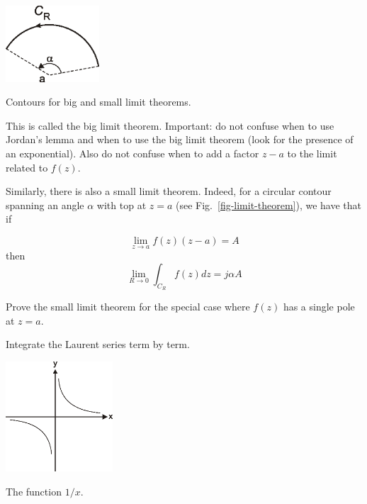 \begin{marginfigure}
\centering
\includegraphics[width=3.5cm]{complex/figures/limit_theorem}
\caption{Contours for big and small limit theorems.}
\label{fig-limit-theorem}
\end{marginfigure}

This is called the big limit theorem. Important: do not confuse when to use Jordan's lemma and when to use the big limit theorem (look for the presence of an exponential). Also do not confuse when to add a factor $z-a$ to the limit related to $f(z)$.

Similarly, there is also a small limit theorem. Indeed, for a circular contour spanning an angle $\alpha$ with top at $z=a$ (see Fig.~\ref{fig-limit-theorem}), we have that if

\begin{equation}
\lim_{z \to a}  f(z) (z-a) = A
\end{equation}
then
\begin{equation}
\lim_{R \to 0} \int_{{C}_R} f(z) dz = j \alpha A
\end{equation}

\begin{exer}
  Prove the small limit theorem for the special case where $f(z)$ has a single pole at $z=a$.
  \begin{hnt}
    Integrate the Laurent series term by term.
  \end{hnt}
\end{exer}


\begin{marginfigure}
\centering
\includegraphics[width=4cm]{complex/figures/pv}
\caption{The function $1/x$.}
\label{fig-pv}
\end{marginfigure}

